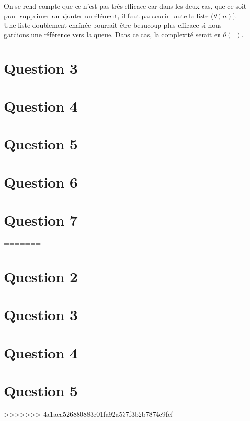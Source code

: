 \documentclass[10pt,a4paper]{article}
\begin{document}
On se rend compte que ce n'est pas très efficace car dans les deux cas, que ce soit pour supprimer ou ajouter un élément, il faut parcourir toute la liste ($\theta (n)$). 
Une liste doublement chaînée pourrait être beaucoup plus efficace si nous gardions une référence vers la queue. Dans ce cas, la complexité serait en $\theta (1)$.

\section*{Question 3}
\section*{Question 4}
\section*{Question 5}
\section*{Question 6}
\section*{Question 7}
=======

\section*{Question 2}
\section*{Question 3}
\section*{Question 4}
\section*{Question 5}


>>>>>>> 4a1aca526880883c01fa92a537f3b2b7874c9fef
\end{document}
